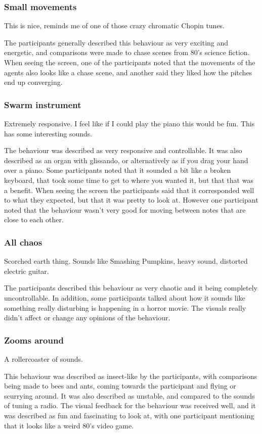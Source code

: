 \documentclass[a4paper,english]{report}
\begin{document}
	\subsubsection{Small movements}
	\begin{displayquote}
		This is nice, reminds me of one of those crazy chromatic Chopin tunes.
	\end{displayquote}
	The participants generally described this behaviour as very exciting and energetic, and comparisons were made to chase scenes from 80's science fiction. When seeing the screen, one of the participants noted that the movements of the agents also looks like a chase scene, and another said they liked how the pitches end up converging.
	\subsubsection{Swarm instrument}
	\begin{displayquote}
		Extremely responsive. I feel like if I could play the piano this would be fun. This has some interesting sounds.
	\end{displayquote}
	The behaviour was described as very responsive and controllable. It was also described as an organ with glissando, or alternatively as if you drag your hand over a piano. Some participants noted that it sounded a bit like a broken keyboard, that took some time to get to where you wanted it, but that that was a benefit. When seeing the screen the participants said that it corresponded well to what they expected, but that it was pretty to look at. However one participant noted that the behaviour wasn't very good for moving between notes that are close to each other.
	\subsubsection{All chaos}
	\begin{displayquote}
		Scorched earth thing. Sounds like Smashing Pumpkins, heavy sound, distorted electric guitar.
	\end{displayquote}
	The participants described this behaviour as very chaotic and it being completely uncontrollable. In addition, some participants talked about how it sounds like something really disturbing is happening in a horror movie. The visuals really didn't affect or change any opinions of the behaviour.
	\subsubsection{Zooms around}
	\begin{displayquote}
		A rollercoaster of sounds.
	\end{displayquote}
	This behaviour was described as insect-like by the participants, with comparisons being made to bees and ants, coming towards the participant and flying or scurrying around. It was also described as unstable, and compared to the sounds of tuning a radio. The visual feedback for the behaviour was received well, and it was described as fun and fascinating to look at, with one participant mentioning that it looks like a weird 80's video game.
\end{document}
